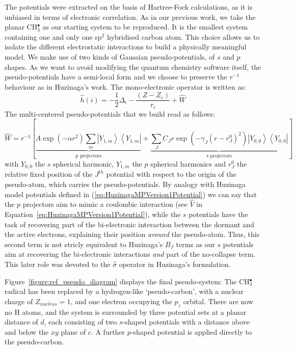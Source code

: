 \documentclass[12pt]{article}
\begin{document}
The potentials were extracted on the basis of Hartree-Fock calculations, as it is unbiased in terms of
electronic correlation. 
As in our previous work,\cite{drujon_pseudopotentials_2013}
we take the planar CH\(^{\bullet}_{3}\) as our starting system to be reproduced.
It is the smallest system containing one and only one sp$^2$ hybridised carbon atom. This choice allows us to isolate the different electrostatic interactions to build a physically meaningful model. We make use of two kinds of Gaussian pseudo-potentials,\cite{me_structure_theory} of \(s\) and \(p\) shapes. As we want to avoid modifying the quantum chemistry software itself, the pseudo-potentials have a semi-local form and we choose to preserve the \(r^{-1}\) behaviour as in Huzinaga's work.
The mono-electronic operator is written as:
\begin{equation}
\label{eq:monoElectronicOperator2}
\hat{h}(i) = -\frac{1}{2}\Delta_i - \frac{(Z-Z_c)}{r_i} + \hat{W}
\end{equation}
The multi-centered pseudo-potentials that we build read as follows:
\begin{equation}
\label{eq:ourPP}
\hat{W} = r^{-1}\left[%
\underbrace{A\exp(-\alpha r^2)\sum_m\left|Y_{1,m}\right>\left<Y_{1,m}\right|}_{\text{p projectors}}%
+%
\underbrace{\sum_JC_Jr\exp(-\gamma_J (r-r^0_J)^2)\left|Y_{0,0}\right>\left<Y_{0,0}\right|}_{\text{s projectors}}%
\right]
\end{equation}
with $Y_{0,0}$ the $s$ spherical harmonic, $Y_{1,m}$ the $p$ spherical harmonics and $r^0_J$ the relative fixed position of the $J^{th}$ potential with respect to the origin of the pseudo-atom, which carries the pseudo-potentials.
By analogy with Huzinaga model potentials defined in (\ref{eq:HuzinagaMPVersion1Potential})
we can say that the $p$ projectors aim to mimic a coulombic interaction (see $\hat{V}$ in Equation~\ref{eq:HuzinagaMPVersion1Potential}),
while the $s$ potentials have the task of recovering part of the bi-electronic interaction
between the dormant and the active electrons, explaining their position \textit{around} the pseudo-atom.
Thus, this second term is not stricly equivalent to Huzinaga's $B_J$ terms as our $s$ potentials aim at recovering
the bi-electronic interactions \textit{and} part of the no-collapse term.
This later role was devoted to the $\hat{\sigma}$ operator in Huzinaga's formulation. 

Figure~\ref{figure:ref_pseudo_diagram} displays the final pseudo-system: The CH\(^{\bullet}_{3}\) radical has been replaced by a hydrogen-like `pseudo-carbon', with a nuclear charge of \(Z_{nucleus} = 1\), and one electron occupying the \(p_{z}\) orbital. 
There are now no H atoms, and the system is surrounded by three potential sets at a planar distance of \(d\), each consisting of 
two \(s\)-shaped potentials with a distance above and below the \(xy\) plane of \(c\). A further \(p\)-shaped potential is applied
directly to the pseudo-carbon.
\end{document}
